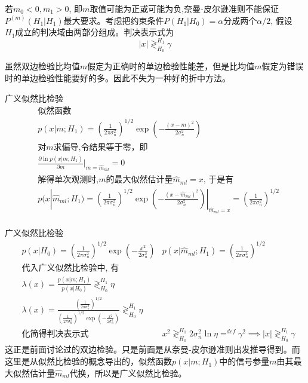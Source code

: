 \begin{frame}
若$m_0<0,m_1>0$, 即$m$取值可能为正或可能为负,奈曼-皮尔逊准则不能保证$P^{(m)}(H_1|H_1)$最大要求。考虑把约束条件$P(H_1|H_0)=\alpha$分成两个$\alpha/2$, 假设$H_1成立$的判决域由两部分组成。判决表示式为
	\[|x|\mathop{\gtrless}_{H_0}^{H_1}\gamma \]

\begin{block}{}
	虽然双边检验比均值$m$假定为正确时的单边检验性能差，但是比均值$m$假定为错误时的单边检验性能要好的多。因此不失为一种好的折中方法。
\end{block}
\end{frame}

\begin{frame}{广义似然比检验}
\begin{align*}
&\text{似然函数}\\
&p(x|m;H_1)=(\frac{1}{2\pi\sigma_n^2})^{1/2}\exp(-\frac{(x-m)^2}{2\sigma_n^2})\\
&\text{对$m$求偏导,令结果等于零，即} \\
&\frac{\partial\ln p(x|m;H_1)}{\partial m}|_{m=\widehat{m}_{ml}}=0\\
&\text{解得单次观测时,$m$的最大似然估计量$\widehat{m}_{ml}=x$, 于是有 }\\
&p(x|\widehat{m}_{ml};H_1)=(\frac{1}{2\pi\sigma_n^2})^{1/2}\exp(-\frac{(x-\widehat{m}_{ml})^2}{2\sigma_n^2})|_{\widehat{m}_{ml}=x}=(\frac{1}{2\pi\sigma_n^2})^{1/2}\\
\end{align*}
\end{frame}

\begin{frame}{广义似然比检验}
\begin{align*}
&p(x|H_0)=(\frac{1}{2\pi\sigma_n^2})^{1/2}\exp(-\frac{x^2}{2\sigma_n^2})
&p(x|\widehat{m}_{ml};H_1)=(\frac{1}{2\pi\sigma_n^2})^{1/2}\\
&\text{代入广义似然比检验中, 有}\\
&\lambda(x)=\frac{p(x|m; H_1)}{p(x|H_0)}\mathop{\gtrless}_{H_0}^{H_1}\eta\\
&\lambda(x)=\frac{(\frac{1}{2\pi\sigma_n^2})^{1/2}}{(\frac{1}{2\pi\sigma_n^2})^{1/2}\exp(-\frac{x^2}{2\sigma_n^2})}\mathop{\gtrless}_{H_0}^{H_1}\eta\\
&\text{化简得判决表示式}
&x^2\mathop{\gtrless}_{H_0}^{H_1}2\sigma_n^2\ln\eta\mathop{=}^{def}\gamma^2 \implies |x|\mathop{\gtrless}_{H_0}^{H_1}\gamma
\end{align*}
这正是前面讨论过的双边检验。只是前面是从奈曼-皮尔逊准则出发推导得到。而这里是从似然比检验的概念导出的，似然函数$p(x|m;H_1)$中的信号参量$m$由其最大似然估计量$\widehat{m}_{ml}$代换，所以是广义似然比检验。
\end{frame}

